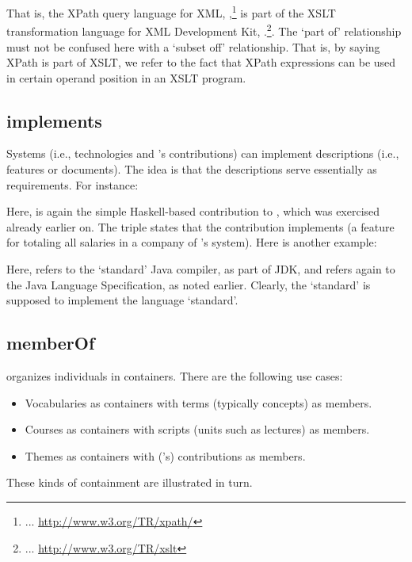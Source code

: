 
\noindent
That is, the XPath query language for XML,
,\footnote{... 
  \url{http://www.w3.org/TR/xpath/}} is part of the XSLT
transformation language for XML
Development Kit, .\footnote{... 
  \url{http://www.w3.org/TR/xslt}}. The `part of' relationship must not
be confused here with a `subset off' relationship. That is, by saying
XPath is part of XSLT, we refer to the fact that XPath expressions can
be used in certain operand position in an XSLT program. 


\subsection{implements}
\label{S:implements}

Systems (i.e., technologies and \ooo{}'s contributions) can implement
descriptions (i.e., features or documents). The idea is that the
descriptions serve essentially as requirements. For instance:


\noindent
Here,  is again the simple Haskell-based
contribution to \ooo{}, which was exercised already earlier on. The
triple states that the contribution implements  (a
feature for totaling all salaries in a company of \ooo{}'s
system). Here is another example:


\noindent
Here,  refers to the `standard' Java compiler, as part
of JDK, and  refers again to the Java Language
Specification, as noted earlier. Clearly, the `standard' is supposed
to implement the language `standard'.


\subsection{memberOf}
\label{S:memberOf}

\solasote{} organizes individuals in containers. There are the
following use cases: 
%
\begin{itemize}
\item Vocabularies as containers with terms (typically concepts) as
  members.
\item Courses as containers with scripts (units such as lectures) as
  members.
\item Themes as containers with (\ooo{}'s) contributions as members.
\end{itemize}
%
These kinds of containment are illustrated in turn.

